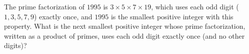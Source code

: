 The prime factorization of $1995$ is $3\times5\times7\times19$, which uses each odd digit ($1,3,5,7,9$) exactly once, and $1995$ is the smallest positive integer with this property. What is the next smallest positive integer whose prime factorization, written as a product of primes, uses each odd digit exactly once (and no other digits)?
